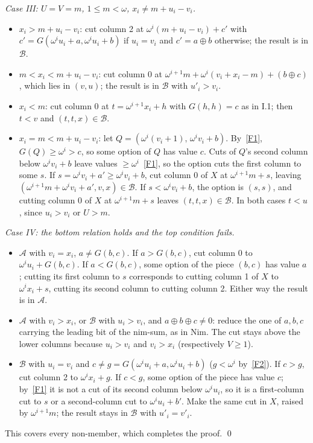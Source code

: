 \documentclass[11pt]{amsart}
\theoremstyle{definition}
\theoremstyle{remark}
\newcommand{\A}{\mathcal{A}}
\newcommand{\B}{\mathcal{B}}
\newcommand{\G}{G}
\newcommand{\nim}{\oplus}
\begin{document}
\emph{Case III: $U=V=m$, $1\le m<\omega$, $x_i\ne m+u_i-v_i$.}
\begin{itemize}
\item[III.1] $x_i>m+u_i-v_i$: cut column 2 at $\omega^i(m+u_i-v_i)+c'$ with
  $c'=\G(\omega^iu_i+a,\omega^iu_i+b)$ if $u_i=v_i$ and $c'=a\nim b$ otherwise; the result is in
  $\B$.
\item[III.2a] $m<x_i<m+u_i-v_i$: cut column 0 at $\omega^{i+1}m+\omega^i(v_i+x_i-m)+(b\nim c)$,
  which lies in $(v,u)$; the result is in $\B$ with $u'_i>v_i$.
\item[III.2b] $x_i<m$: cut column 0 at $t=\omega^{i+1}x_i+h$ with $\G(h,h)=c$ as in I.1; then
  $t<v$ and $(t,t,x)\in\B$.
\item[III.2c] $x_i=m<m+u_i-v_i$: let $Q=(\omega^i(v_i+1),\,\omega^iv_i+b)$. By~\ref{F1},
  $\G(Q)\ge\omega^i>c$, so some option of $Q$ has value $c$. Cuts of $Q$'s second column below
  $\omega^iv_i+b$ leave values $\ge\omega^i$~\ref{F1}, so the option cuts the first column to
  some $s$. If $s=\omega^iv_i+a'\ge\omega^iv_i+b$, cut column 0 of $X$ at $\omega^{i+1}m+s$,
  leaving $(\omega^{i+1}m+\omega^iv_i+a',v,x)\in\B$. If $s<\omega^iv_i+b$, the option is $(s,s)$,
  and cutting column 0 of $X$ at $\omega^{i+1}m+s$ leaves $(t,t,x)\in\B$. In both cases $t<u$,
  since $u_i>v_i$ or $U>m$.
\end{itemize}

\emph{Case IV: the bottom relation holds and the top condition fails.}
\begin{itemize}
\item[IV.1] $\A$ with $v_i=x_i$, $a\ne\G(b,c)$. If $a>\G(b,c)$, cut column 0 to
  $\omega^iu_i+\G(b,c)$. If $a<\G(b,c)$, some option of the piece $(b,c)$ has value $a$; cutting
  its first column to $s$ corresponds to cutting column 1 of $X$ to $\omega^ix_i+s$, cutting its
  second column to cutting column 2. Either way the result is in $\A$.
\item[IV.2] $\A$ with $v_i>x_i$, or $\B$ with $u_i>v_i$, and $a\nim b\nim c\ne0$: reduce the one of
  $a,b,c$ carrying the leading bit of the nim-sum, as in Nim. The cut stays above the lower
  columns because $u_i>v_i$ and $v_i>x_i$ (respectively $V\ge1$).
\item[IV.3] $\B$ with $u_i=v_i$ and $c\ne g=\G(\omega^iu_i+a,\omega^iu_i+b)$ ($g<\omega^i$
  by~\ref{F2}). If $c>g$, cut column 2 to $\omega^ix_i+g$. If $c<g$, some option of the piece has
  value $c$; by~\ref{F1} it is not a cut of its second column below $\omega^iu_i$, so it is a
  first-column cut to $s$ or a second-column cut to $\omega^iu_i+b'$. Make the same cut in $X$,
  raised by $\omega^{i+1}m$; the result stays in $\B$ with $u'_i=v'_i$.
\end{itemize}
This covers every non-member, which completes the proof. \qed
\end{document}
